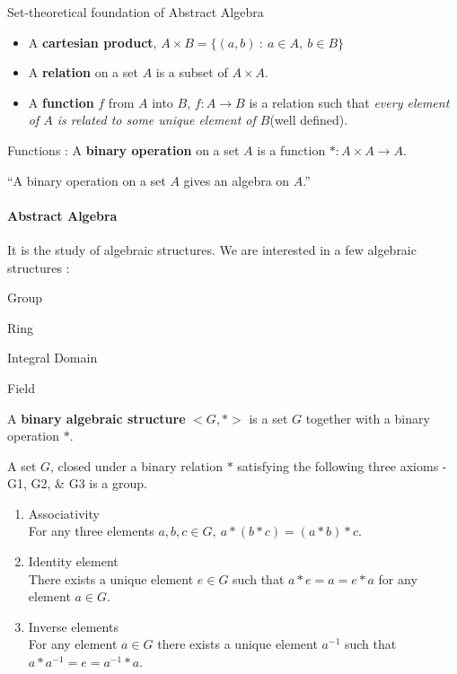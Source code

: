 \begin{definition}Set-theoretical foundation of Abstract Algebra
	\begin{itemize}
		\item A \textbf{cartesian product}, $A \times B = \{ (a,b) \ : \ a \in A,\ b \in B \}$ %
		\item A \textbf{relation} on a set $A$ is a subset of $A \times A$. %
		\item A \textbf{function} $f$ from $A$ into $B$, $f : A \to B$ is a relation such that \textit{every element of $A$ is related to some unique element of $B$}(well defined). %
	\end{itemize}
\end{definition}

\begin{definition} Functions :
	A \textbf{binary operation} on a set $A$ is a function $\ast : A \times A \to A$. %
\end{definition}

``A binary operation on a set $A$ gives an algebra on $A$.'' %
\begin{story}
\paragraph{Abstract Algebra}
	It is the study of algebraic structures. We are interested in a few algebraic structures :
	\begin{enumerate*}
		\item Group
		\item Ring
		\item Integral Domain
		\item Field
	\end{enumerate*}
\end{story}

\begin{definition}
	A \textbf{binary algebraic structure} $<\!G,\ast\!>$ is a set $G$ together with a binary operation $\ast$.
\end{definition}

\begin{definition}[Group]
	A set $G$, closed under a binary relation $\ast$ satisfying the following three axioms -G1, G2, \& G3 is a group.%
\begin{enumerate}[label=G\arabic*]
	\item Associativity \\ For any three elements $a,b,c \in G,\ a \ast (b \ast c) = (a \ast b) \ast c$.
	\item Identity element \\There exists a unique element $e \in G$ such that $a \ast e = a = e \ast a$ for any element $a \in G$.
	\item Inverse elements \\For any element $a \in G$ there exists a unique element $a^{-1}$ such that $a \ast a^{-1} = e = a^{-1} \ast a$.
\end{enumerate}
\end{definition}

